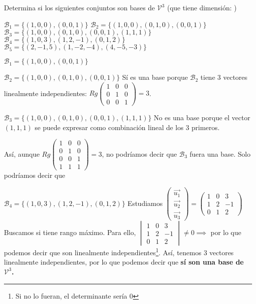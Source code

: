 \begin{problem}

  Determina si los siguientes conjuntos son bases de $\mathcal{V}^3$ (que tiene dimensión: )
    
\ppart $\mathcal{B}_1 = \{(1,0,0), (0,0,1)\}$
\ppart $\mathcal{B}_2 = \{(1,0,0), (0,1,0),(0,0,1)\}$
\ppart $\mathcal{B}_3 = \{(1,0,0), (0,1,0),(0,0,1),(1,1,1)\}$
\ppart $\mathcal{B}_4 = \{(1,0,3),(1,2,-1),(0,1,2)\}$
\ppart $\mathcal{B}_5 = \{(2,-1,5),(1,-2,-4),(4,-5,-3)\}$
    \solution

        
        \spart $\mathcal{B}_1 = \{(1,0,0), (0,0,1)\}$
        \subitem {}
        
        \spart $\mathcal{B}_2 = \{(1,0,0), (0,1,0),(0,0,1)\}$
        \subitem Sí es una base porque $\mathcal{B}_2$ tiene 3 vectores linealmente independientes: $Rg\displaystyle\begin{pmatrix}1&0&0\\0&1&0\\0&0&1\end{pmatrix} = 3$.
        
        \spart $\mathcal{B}_3 = \{(1,0,0), (0,1,0),(0,0,1),(1,1,1)\}$
        \subitem No es una base porque el vector $(1,1,1)$ se puede expresar como combinación lineal de los 3 primeros. 
        
        Así, aunque $\displaystyle Rg\begin{pmatrix}1&0&0\\0&1&0\\0&0&1\\1&1&1\end{pmatrix} = 3$, no podríamos decir que $\mathcal{B}_3$ fuera una base. Solo podríamos decir que 
        
        
        \spart $\mathcal{B}_4 = \{(1,0,3),(1,2,-1),(0,1,2)\}$
        \subitem Estudiamos $\displaystyle \begin{pmatrix}\vec{u_1}\\\vec{u_2}\\\vec{u_3}\end{pmatrix} = \begin{pmatrix}1&0&3\\1&2&-1\\0&1&2\end{pmatrix}$ 
        Buscamos si tiene rango máximo. Para ello, $\begin{vmatrix}1&0&3\\1&2&-1\\0&1&2\end{vmatrix} \neq 0 \implies $ por lo que podemos decir que son linealmente independientes\footnote{Si no lo fueran, el determinante sería 0}. Así, tenemos 3 vectores linealmente independientes, por lo que podemos decir que \textbf{sí son una base de $\mathcal{V}^3$.}
        

\end{problem}
